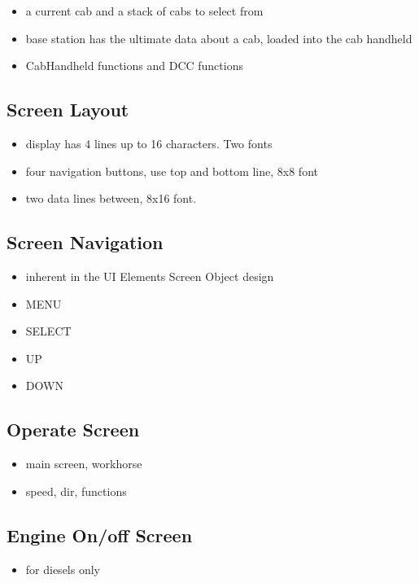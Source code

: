 \begin{itemize}
\item a current cab and a stack of cabs to select from
\item base station has the ultimate data about a cab, loaded into the cab handheld
\item CabHandheld functions and DCC functions
\end{itemize}

\subsection{Screen Layout}

\begin{itemize}
\item display has 4 lines up to 16 characters. Two fonts
\item four navigation buttons, use top and bottom line, 8x8 font
\item two data lines between, 8x16 font.
\end{itemize}

\subsection{Screen Navigation}

\begin{itemize}
\item inherent in the UI Elements Screen Object design
\item MENU
\item SELECT
\item UP
\item DOWN
\end{itemize}

\subsection{Operate Screen}

\begin{itemize}
\item main screen, workhorse
\item speed, dir, functions
\end{itemize}

\subsection{Engine On/off Screen}

\begin{itemize}
\item for diesels only
\end{itemize}

